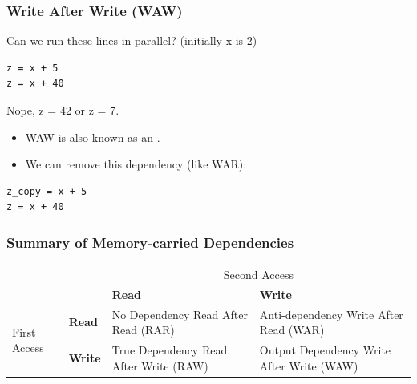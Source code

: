\documentclass[aspectratio=43]{beamer}
\newenvironment{changemargin}[1]{%
  \begin{list}{}{%
    \setlength{\topsep}{0pt}%
    \setlength{\leftmargin}{#1}%
    \setlength{\rightmargin}{1em}
    \setlength{\listparindent}{\parindent}%
    \setlength{\itemindent}{\parindent}%
    \setlength{\parsep}{\parskip}%
  }%
  \item[]}{\end{list}}
\begin{document}
\begin{frame}[fragile]
\frametitle{Write After Write (WAW)}
\begin{changemargin}{2.5cm}
Can we run these lines in parallel? (initially x is 2)
\begin{lstlisting}
z = x + 5
z = x + 40
\end{lstlisting}
\pause
\alert{Nope, z = 42 or z = 7}.\\[1em]
\begin{itemize}
\item WAW is also known as an .
\item We can remove this dependency (like WAR):
\end{itemize}
\pause
\begin{lstlisting}
z_copy = x + 5
z = x + 40
\end{lstlisting}
\end{changemargin}
\end{frame}

\begin{frame}
\frametitle{Summary of Memory-carried Dependencies}
\begin{center}
\begin{tabular}{ll|p{2.8cm}p{3.2cm}}
& & \multicolumn{2}{c}{Second Access} \\ 
&  & \bf Read & \bf Write \\ \hline
\multirow{2}{*}{First Access} & \bf Read & No Dependency Read After Read (RAR)  & Anti-dependency Write After Read (WAR) \\[0.5em]
& \bf Write & True Dependency Read After Write (RAW) & Output Dependency Write After Write (WAW) \\
\end{tabular}
\end{center}
\end{frame}
\end{document}
